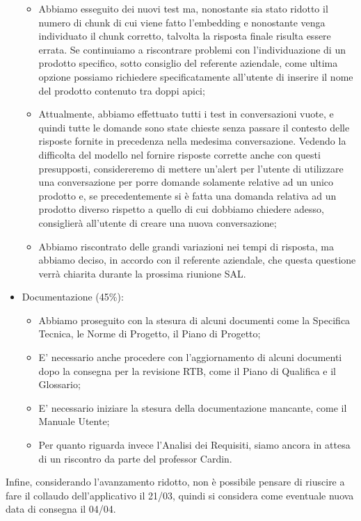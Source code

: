 \begin{itemize}
\begin{itemize}
        \item Abbiamo esseguito dei nuovi test ma, nonostante sia stato ridotto il numero di chunk di cui viene fatto l'embedding e nonostante venga individuato il chunk corretto, talvolta la risposta finale risulta essere errata. Se continuiamo a riscontrare problemi con l'individuazione di un prodotto specifico, sotto consiglio del referente aziendale, come ultima opzione possiamo richiedere specificatamente all'utente di inserire il nome del prodotto contenuto tra doppi apici;
        \item Attualmente, abbiamo effettuato tutti i test in conversazioni vuote, e quindi tutte le domande sono state chieste senza passare il contesto delle risposte fornite in precedenza nella medesima conversazione. Vedendo la difficolta del modello nel fornire risposte corrette anche con questi presupposti, considereremo di mettere un'alert per l'utente di utilizzare una conversazione per porre domande solamente relative ad un unico prodotto e, se precedentemente si è fatta una domanda relativa ad un prodotto diverso rispetto a quello di cui dobbiamo chiedere adesso, consiglierà all'utente di creare una nuova conversazione;
        \item Abbiamo riscontrato delle grandi variazioni nei tempi di risposta, ma abbiamo deciso, in accordo con il referente aziendale, che questa questione verrà chiarita durante la prossima riunione SAL.
    \end{itemize}
    \item Documentazione (45\%): 
    \begin{itemize}
        \item Abbiamo proseguito con la stesura di alcuni documenti come la Specifica Tecnica, le Norme di Progetto, il Piano di Progetto;
        \item E' necessario anche procedere con l'aggiornamento di alcuni documenti dopo la consegna per la revisione RTB, come il Piano di Qualifica e il Glossario;
        \item E' necessario iniziare la stesura della documentazione mancante, come il Manuale Utente;
        \item Per quanto riguarda invece l'Analisi dei Requisiti, siamo ancora in attesa di un riscontro da parte del professor Cardin.
    \end{itemize}
\end{itemize}
Infine, considerando l'avanzamento ridotto, non è possibile pensare di riuscire a fare il collaudo dell'applicativo il 21/03, quindi si considera come eventuale nuova data di consegna il 04/04.
